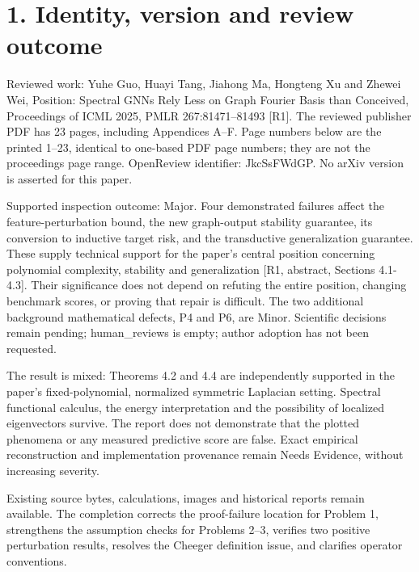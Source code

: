 \documentclass[10pt]{article}
\begin{document}
\section*{1. Identity, version and review outcome}
Reviewed work: Yuhe Guo, Huayi Tang, Jiahong Ma, Hongteng Xu and Zhewei Wei, Position: Spectral GNNs Rely Less on Graph Fourier Basis than Conceived, Proceedings of ICML 2025, PMLR 267:81471–81493 [R1]. The reviewed publisher PDF has 23 pages, including Appendices A–F. Page numbers below are the printed 1–23, identical to one-based PDF page numbers; they are not the proceedings page range. OpenReview identifier: JkcSsFWdGP. No arXiv version is asserted for this paper.\par
Supported inspection outcome: Major. Four demonstrated failures affect the feature-perturbation bound, the new graph-output stability guarantee, its conversion to inductive target risk, and the transductive generalization guarantee. These supply technical support for the paper’s central position concerning polynomial complexity, stability and generalization [R1, abstract, Sections 4.1-4.3]. Their significance does not depend on refuting the entire position, changing benchmark scores, or proving that repair is difficult. The two additional background mathematical defects, P4 and P6, are Minor. Scientific decisions remain pending; human\_reviews is empty; author adoption has not been requested.\par
The result is mixed: Theorems 4.2 and 4.4 are independently supported in the paper’s fixed-polynomial, normalized symmetric Laplacian setting. Spectral functional calculus, the energy interpretation and the possibility of localized eigenvectors survive. The report does not demonstrate that the plotted phenomena or any measured predictive score are false. Exact empirical reconstruction and implementation provenance remain Needs Evidence, without increasing severity.\par
Existing source bytes, calculations, images and historical reports remain available. The completion corrects the proof-failure location for Problem 1, strengthens the assumption checks for Problems 2–3, verifies two positive perturbation results, resolves the Cheeger definition issue, and clarifies operator conventions.\par
\end{document}
